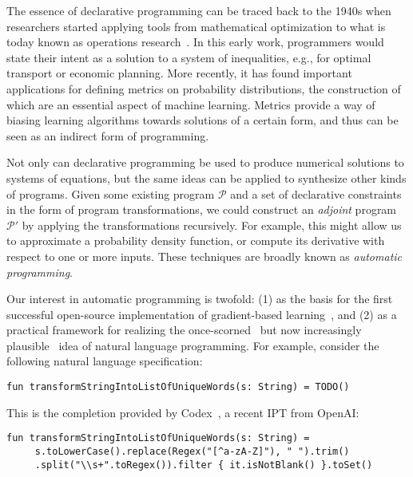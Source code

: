 \documentclass[12pt]{article}
\begin{document}
The essence of declarative programming can be traced back to the 1940s when researchers started applying tools from mathematical optimization to what is today known as operations research~\cite{kantorovich1960mathematical}. In this early work, programmers would state their intent as a solution to a system of inequalities, e.g., for optimal transport or economic planning. More recently, it has found important applications for defining metrics on probability distributions, the construction of which are an essential aspect of machine learning. Metrics provide a way of biasing learning algorithms towards solutions of a certain form, and thus can be seen as an indirect form of programming.

Not only can declarative programming be used to produce numerical solutions to systems of equations, but the same ideas can be applied to synthesize other kinds of programs. Given some existing program $\mathcal P$ and a set of declarative constraints in the form of program transformations, we could construct an \textit{adjoint} program $\mathcal P'$ by applying the transformations recursively. For example, this might allow us to approximate a probability density function, or compute its derivative with respect to one or more inputs. These techniques are broadly known as \textit{automatic programming}.

Our interest in automatic programming is twofold: (1) as the basis for the first successful open-source implementation of gradient-based learning~\cite{baydin2018automatic}, and (2) as a practical framework for realizing the once-scorned~\cite{dijkstra1979foolishness} but now increasingly plausible~\cite{chen2021evaluating} idea of natural language programming. For example, consider the following natural language specification:

\begin{lstlisting}[basicstyle=\footnotesize\ttfamily]
  fun transformStringIntoListOfUniqueWords(s: String) = TODO()
\end{lstlisting}

\noindent This is the completion provided by Codex~\cite{chen2021evaluating}, a recent IPT from OpenAI:

\begin{lstlisting}[basicstyle=\footnotesize\ttfamily]
  fun transformStringIntoListOfUniqueWords(s: String) =
     s.toLowerCase().replace(Regex("[^a-zA-Z]"), " ").trim()
     .split("\\s+".toRegex()).filter { it.isNotBlank() }.toSet()
\end{lstlisting}
\end{document}

